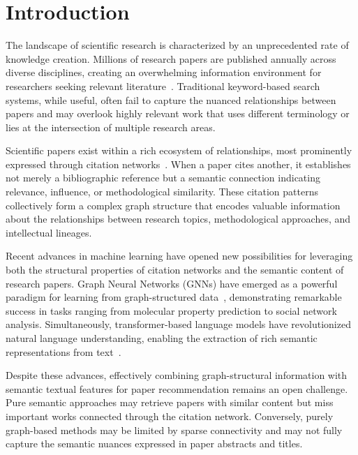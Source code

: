 \documentclass[pdflatex,sn-mathphys-num]{sn-jnl}
\theoremstyle{thmstyleone}%
\theoremstyle{thmstyletwo}%
\theoremstyle{thmstylethree}%
\begin{document}
\section{Introduction}\label{sec:intro}

The landscape of scientific research is characterized by an unprecedented rate of knowledge creation. Millions of research papers are published annually across diverse disciplines, creating an overwhelming information environment for researchers seeking relevant literature~\cite{lo2020s2orc}. Traditional keyword-based search systems, while useful, often fail to capture the nuanced relationships between papers and may overlook highly relevant work that uses different terminology or lies at the intersection of multiple research areas.

Scientific papers exist within a rich ecosystem of relationships, most prominently expressed through citation networks~\cite{newman2001structure}. When a paper cites another, it establishes not merely a bibliographic reference but a semantic connection indicating relevance, influence, or methodological similarity. These citation patterns collectively form a complex graph structure that encodes valuable information about the relationships between research topics, methodological approaches, and intellectual lineages.

Recent advances in machine learning have opened new possibilities for leveraging both the structural properties of citation networks and the semantic content of research papers. Graph Neural Networks (GNNs) have emerged as a powerful paradigm for learning from graph-structured data~\cite{wu2019comprehensive,zhou2020graph}, demonstrating remarkable success in tasks ranging from molecular property prediction to social network analysis. Simultaneously, transformer-based language models have revolutionized natural language understanding, enabling the extraction of rich semantic representations from text~\cite{vaswani2017attention,reimers2019sentence}.

Despite these advances, effectively combining graph-structural information with semantic textual features for paper recommendation remains an open challenge. Pure semantic approaches may retrieve papers with similar content but miss important works connected through the citation network. Conversely, purely graph-based methods may be limited by sparse connectivity and may not fully capture the semantic nuances expressed in paper abstracts and titles.
\end{document}
